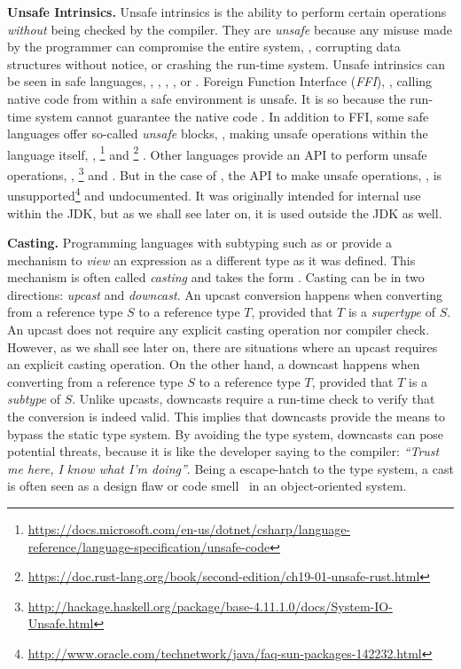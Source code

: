 \textbf{Unsafe Intrinsics.}
Unsafe intrinsics is the ability to perform certain operations \emph{without} being checked by the compiler.
They are \emph{unsafe} because any misuse made by the programmer can compromise the entire system, \eg{},
corrupting data structures without notice, or
crashing the run-time system.
Unsafe intrinsics can be seen in safe languages, \eg{},
,
,
, or
.
Foreign Function Interface (\emph{FFI}), \ie{}, calling native code from within a safe environment is unsafe.
It is so because the run-time system cannot guarantee
the native code
.
In addition to FFI, some safe languages offer so-called \emph{unsafe} blocks, \ie{}, making unsafe operations within the language itself, \eg{},
\footnote{\url{https://docs.microsoft.com/en-us/dotnet/csharp/language-reference/language-specification/unsafe-code}}
and
\footnote{\url{https://doc.rust-lang.org/book/second-edition/ch19-01-unsafe-rust.html}}
.
Other languages provide an API to perform unsafe operations, \eg{},
\footnote{\url{http://hackage.haskell.org/package/base-4.11.1.0/docs/System-IO-Unsafe.html}}
and
.
But in the case of , the API to make unsafe operations,
,
is unsupported\footnote{\url{http://www.oracle.com/technetwork/java/faq-sun-packages-142232.html}}
and undocumented.
It was originally intended for internal use within the JDK, but as we shall see later on, it is used outside the JDK as well.

\textbf{Casting.}
Programming languages with subtyping such as \java{} or \cpp{} provide a mechanism to \emph{view} an expression as a different type as it was defined.
This mechanism is often called \emph{casting} and takes the form .
Casting can be in two directions: \emph{upcast} and \emph{downcast}.
An upcast conversion happens when converting from a reference type $S$ to a reference type $T$, provided that $T$ is a \emph{supertype} of $S$.
An upcast does not require any explicit casting operation nor compiler check.
However, as we shall see later on, there are situations where an upcast requires an explicit casting operation.
On the other hand, a downcast happens when converting from a reference type $S$ to a reference type $T$, provided that $T$ is a \emph{subtype} of $S$.
Unlike upcasts, downcasts require a run-time check to verify that the conversion is indeed valid.
This implies that downcasts provide the means to bypass the static type system.
By avoiding the type system, downcasts can pose potential threats, because it is like the developer saying to the compiler: \emph{``Trust me here, I know what I'm doing''}.
Being a escape-hatch to the type system,
a cast is often seen as a design flaw or code smell~\citep{tufanoWhenWhyYour2015} in an object-oriented system.


